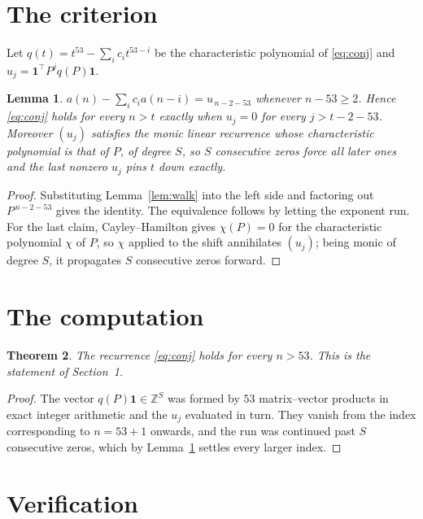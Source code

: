 \documentclass[11pt,a4paper]{article}
\theoremstyle{plain}
\newtheorem{theorem}{Theorem}
\newtheorem{lemma}[theorem]{Lemma}
\theoremstyle{definition}
\begin{document}
\section{The criterion}

Let $q(t)=t^{53}-\sum_i c_i t^{53-i}$ be the characteristic polynomial of
\eqref{eq:conj} and $u_j=\mathbf{1}^{\!\top}P^{j}q(P)\mathbf{1}$.

\begin{lemma}\label{lem:crit}
$a(n)-\sum_i c_i a(n-i)=u_{\,n-2-53}$ whenever $n-53\ge2$. Hence
\eqref{eq:conj} holds for every $n>t$ exactly when $u_j=0$ for every
$j>t-2-53$. Moreover $(u_j)$ satisfies the monic linear recurrence whose
characteristic polynomial is that of $P$, of degree $S$, so $S$ consecutive zeros force all
later ones and the last nonzero $u_j$ pins $t$ down exactly.
\end{lemma}

\begin{proof}
Substituting Lemma~\ref{lem:walk} into the left side and factoring out
$P^{\,n-2-53}$ gives the identity. The equivalence follows by letting the exponent
run. For the last claim, Cayley--Hamilton gives $\chi(P)=0$ for the characteristic
polynomial $\chi$ of $P$, so $\chi$ applied to the shift annihilates $(u_j)$; being monic of
degree $S$, it propagates $S$ consecutive zeros forward.
\end{proof}

\section{The computation}

\begin{theorem}
The recurrence \eqref{eq:conj} holds for every $n>53$. This is the statement of
Section~1.
\end{theorem}

\begin{proof}
The vector $q(P)\mathbf{1}\in\mathbb{Z}^{S}$ was formed by $53$ matrix--vector
products in exact integer arithmetic and the $u_j$ evaluated in turn. They vanish from the
index corresponding to $n=53+1$ onwards, and the run was continued past $S$ consecutive
zeros, which by Lemma~\ref{lem:crit} settles every larger index.
\end{proof}

\section{Verification}
\end{document}
